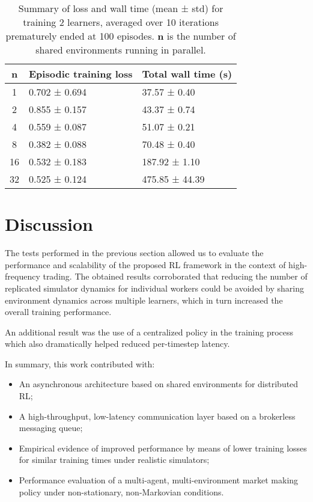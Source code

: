 \begin{table}[h!]
    \centering
    \renewcommand{\arraystretch}{1.2}
    \begin{tabularx}{\textwidth}{|c|X|X|}
        \hline
        \textbf{n} & \textbf{Episodic training loss} & \textbf{Total wall time (s)} \\
        \hline
        1          & 0.702 ± 0.694                 & 37.57 ± 0.40             \\
        2          & 0.855 ± 0.157                 & 43.37 ± 0.74             \\
        4          & 0.559 ± 0.087                 & 51.07 ± 0.21             \\
        8          & 0.382 ± 0.088                 & 70.48 ± 0.40             \\
        16         & 0.532 ± 0.183                 & 187.92 ± 1.10            \\
        32         & 0.525 ± 0.124                 & 475.85 ± 44.39           \\
        \hline
    \end{tabularx}
    \caption{
        Summary of loss and wall time (mean ± std) for training $2$ learners, averaged over 10 iterations prematurely ended at 100 episodes.
        $\textbf{n}$ is the number of shared environments running in parallel.
    }
    \label{tab:summary}
\end{table}


\section{Discussion}
\label{sec:discussion}

The tests performed in the previous section allowed us to evaluate the performance and scalability of the proposed RL framework in the context of high-frequency trading.
The obtained results corroborated that reducing the number of replicated simulator dynamics for individual workers could be avoided
by sharing environment dynamics across multiple learners, which in turn increased the overall training performance.

An additional result was the use of a centralized policy in the training process which also dramatically helped reduced per-timestep latency.

In summary, this work contributed with:
\begin{itemize}
    \item An asynchronous architecture based on shared environments for distributed RL;
    \item A high-throughput, low-latency communication layer based on a brokerless messaging queue;
    \item Empirical evidence of improved performance by means of lower training losses for similar training times under realistic simulators;
    \item Performance evaluation of a multi-agent, multi-environment market making policy under non-stationary, non-Markovian conditions.
\end{itemize}

